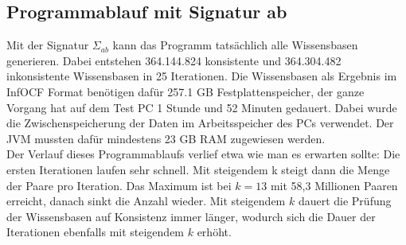 \documentclass[12pt,a4paper]{article}
\begin{document}
\subsection{Programmablauf mit Signatur ab}

Mit der Signatur $\Sigma_{ab}$ kann das Programm tatsächlich alle Wissensbasen generieren. Dabei entstehen 364.144.824 konsistente und 364.304.482 inkonsistente Wissensbasen in 25 Iterationen. Die Wissensbasen als Ergebnis im InfOCF Format benötigen dafür 257.1 GB Festplattenspeicher, der ganze Vorgang hat auf dem Test PC 1 Stunde und 52 Minuten gedauert. Dabei wurde die Zwischenspeicherung der Daten im Arbeitsspeicher des PCs verwendet. Der JVM mussten dafür mindestens 23 GB RAM zugewiesen werden. \\
Der Verlauf dieses Programmablaufs verlief etwa wie man es erwarten sollte: Die ersten Iterationen laufen sehr schnell. Mit steigendem k steigt dann die Menge der Paare pro Iteration. Das Maximum ist bei $k=13$ mit 58,3 Millionen Paaren erreicht, danach sinkt die Anzahl wieder. Mit steigendem $k$ dauert die Prüfung der Wissensbasen auf Konsistenz immer länger, wodurch sich die Dauer der Iterationen ebenfalls mit steigendem $k$ erhöht.
\end{document}
